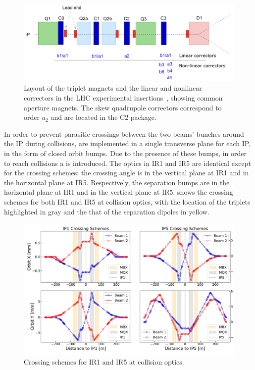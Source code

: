 \begin{figure}[!hbt]
  \centering
  \includegraphics*[width=0.92\linewidth]{Figures/Optics_Measurements_Corrections_at_LHC/corrector_package.png}
  \caption{Layout of the triplet magnets and the linear and nonlinear correctors in the LHC experimental insertions~\cite{CERN:Bruning:Dynap_Studies}, showing common aperture magnets. The skew quadrupole correctors correspond to order \(a_2\) and are located in the C\num{2} package.}
  \label{figure:lhc_ir_corrector_layout}
\end{figure}

In order to prevent parasitic crossings between the two beams' bunches around the IP during collisions,  are implemented in a single transverse plane for each IP, in the form of closed orbit bumps.
Due to the presence of these bumps, in order to reach collisions a  is introduced.
The optics in IR\num{1} and IR\num{5} are identical except for the crossing schemes: the crossing angle is in the vertical plane at IR\num{1} and in the horizontal plane at IR\num{5}.
Respectively, the separation bumps are in the horizontal plane at IR\num{1} and in the vertical plane at IR\num{5}.
 shows the crossing schemes for both IR\num{1} and IR\num{5} at collision optics, with the location of the triplets highlighted in gray and the that of the separation dipoles in yellow.

\begin{figure}[!hbt]
  \centering
  \includegraphics*[width=0.99\linewidth]{Figures/Optics_Measurements_Corrections_at_LHC/lhc_crossing_schemes_ip15.pdf}
  \caption{Crossing schemes for IR\num{1} and IR\num{5} at collision optics.}
  \label{figure:lhc_crossing_schemes_ip15}
\end{figure}

